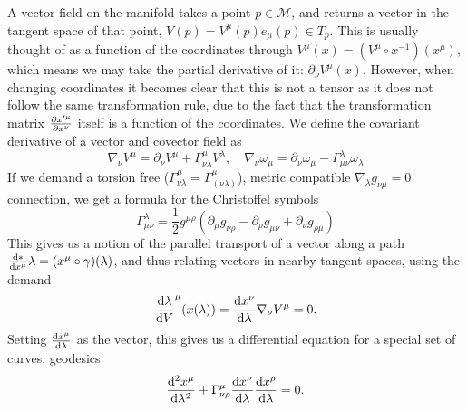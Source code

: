 A vector field on the manifold takes a point $p \in \mathcal{M} $, and returns a vector in the tangent space of that point, $V(p) = V^\mu (p) e_\mu(p) \in T_p$.
This is usually thought of as a function of the coordinates through $V^\mu(x) = (V^\mu \circ x^{-1}) (x^\mu)$, which means we may take the partial derivative of it: $\partial_\nu V^\mu (x)$.
However, when changing coordinates it becomes clear that this is not a tensor as it does not follow the same transformation rule, due to the fact that the transformation matrix $\pdv{x'^\mu}{x^\nu}$ itself is a function of the coordinates.
We define the covariant derivative of a vector and covector field as
\begin{equation*}
    \nabla_\nu V^\mu = \partial_\nu V ^\mu + \Gamma^\mu_{\nu \lambda} V^\lambda, \quad \nabla_\nu \omega_\mu = \partial_\nu \omega_\mu - \Gamma^\lambda_{\mu \nu} \omega_\lambda
\end{equation*}
If we demand a torsion free ($\Gamma^\mu_{\nu\lambda} = \Gamma^\mu_{(\nu\lambda)}$), metric compatible $\nabla_\lambda g_{\nu\mu} = 0$ connection, we get a formula for the Christoffel symbols
\begin{equation*}
    \Gamma^\lambda_{\mu\nu} = \frac{1}{2} g^{\mu \rho}\left(\partial_\mu g_{\nu\rho} - \partial_\rho g_{\mu\nu} + \partial_\nu g_{\rho\mu}\right) 
\end{equation*}
This gives us a notion of the parallel transport of a vector along a path $\odv*{x^\mu}{\lambda} = (x^\mu \circ \gamma)(\lambda)$, and thus relating vectors in nearby tangent spaces, using the demand
\begin{equation*}
    \odv{\lambda} V^\mu(x(\lambda)) = \odv{x^\nu}{\lambda} \nabla_\nu V^\mu = 0.
\end{equation*}
Setting $\odv{x^\mu}{\lambda}$ as the vector, this gives us a differential equation for a special set of curves, geodesics
\begin{equation*}
    \odv[2]{x^\mu}{\lambda} + \Gamma^\mu_{\nu \rho} \odv{x^\nu}{\lambda}\odv{x^\rho} {\lambda} = 0.
\end{equation*}

